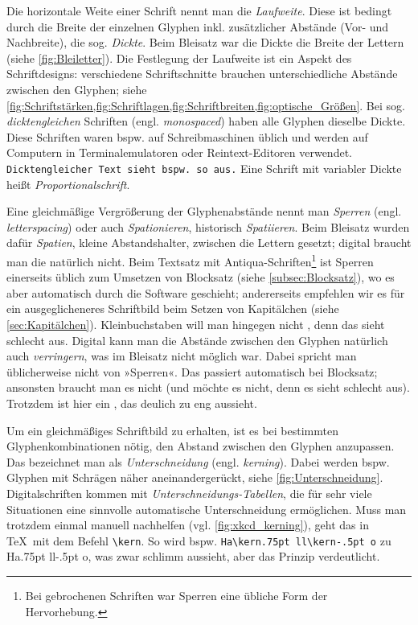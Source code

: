 Die horizontale Weite einer Schrift nennt man die \emph{Laufweite}.
Diese ist bedingt durch die Breite der einzelnen Glyphen
inkl. zusätzlicher Abstände (Vor- und Nachbreite), die
sog. \emph{Dickte}.  Beim Bleisatz war die Dickte die Breite der
Lettern (siehe \cref{fig:Bleiletter}).  Die Festlegung der Laufweite
ist ein Aspekt des Schriftdesigns: verschiedene Schriftschnitte
brauchen unterschiedliche Abstände zwischen den Glyphen; siehe
\cref{fig:Schriftstärken,fig:Schriftlagen,fig:Schriftbreiten,fig:optische_Größen}.
Bei sog. \emph{dicktengleichen} Schriften
(engl. \emph{\foreignlanguage{british}{monospaced}}) haben alle
Glyphen dieselbe Dickte.  Diese Schriften waren bspw. auf
Schreibmaschinen üblich und werden auf Computern in Terminalemulatoren
oder Reintext-Editoren verwendet.  \texttt{Dicktengleicher Text sieht
  bspw. so aus.}  Eine Schrift mit variabler Dickte heißt
\emph{Proportionalschrift}.

\enlargethispage{\baselineskip}

Eine gleichmäßige Vergrößerung der Glyphenabstände nennt man
\emph{Sperren} (engl. \emph{\foreignlanguage{british}{letterspacing}})
oder auch \emph{Spationieren}, historisch \emph{Spatiieren}.  Beim
Bleisatz wurden dafür \emph{Spatien}, kleine Abstandshalter, zwischen
die Lettern gesetzt; digital braucht man die natürlich nicht.  Beim
Textsatz mit Antiqua-Schriften\footnote{Bei gebrochenen Schriften war
  Sperren eine übliche Form der Hervorhebung.} ist Sperren einerseits
üblich zum Umsetzen von Blocksatz (siehe \cref{subsec:Blocksatz}), wo
es aber automatisch durch die Software geschieht; andererseits
empfehlen wir es für ein ausgeglicheneres Schriftbild beim Setzen von
Kapitälchen (siehe \cref{sec:Kapitälchen}).  Kleinbuchstaben will man
hingegen nicht , denn das sieht schlecht aus.
Digital kann man die Abstände zwischen den Glyphen natürlich auch
\emph{verringern}, was im Bleisatz nicht möglich war.  Dabei spricht
man üblicherweise nicht von »Sperren«.  Das passiert automatisch bei
Blocksatz; ansonsten braucht man es nicht (und möchte es nicht, denn
es sieht schlecht aus).  Trotzdem ist hier ein ,
das deulich zu eng aussieht.

Um ein gleichmäßiges Schriftbild zu erhalten, ist es bei bestimmten
Glyphenkombinationen nötig, den Abstand zwischen den Glyphen
anzupassen.  Das bezeichnet man als \emph{Unterschneidung}
(engl. \emph{\foreignlanguage{british}{kerning}}).  Dabei werden
bspw. Glyphen mit Schrägen näher aneinandergerückt, siehe
\cref{fig:Unterschneidung}.  Digitalschriften kommen mit
\emph{Un\-ter\-schnei\-dungs-Tabellen}, die für sehr viele Situationen
eine sinnvolle automatische Unterschneidung ermöglichen.  Muss man
trotzdem einmal manuell nachhelfen (vgl. \cref{fig:xkcd_kerning}),
geht das in \TeX\ mit dem Befehl \verb!\kern!.  So wird
bspw. \verb!Ha\kern.75pt ll\kern-.5pt o! zu Ha\kern.75pt ll\kern-.5pt
o, was zwar schlimm aussieht, aber das Prinzip verdeutlicht.

